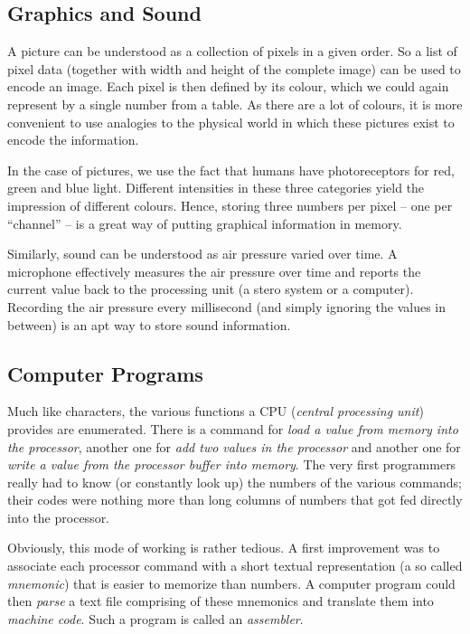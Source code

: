 \subsection{Graphics and Sound}
A picture can be understood as a collection of pixels in a given order. So a list of pixel data (together with width and height of the complete image) can be used to encode an image. Each pixel is then defined by its colour, which we could again represent by a single number from a table. As there are a lot of colours\citationneeded, it is more convenient to use analogies to the physical world in which these pictures exist to encode the information.

In the case of pictures, we use the fact that humans have photoreceptors for red, green and blue light. Different intensities in these three categories yield the impression of different colours. Hence, storing three numbers per pixel -- one per \enquote{channel} -- is a great way of putting graphical information in memory.

Similarly, sound can be understood as air pressure varied over time. A microphone effectively measures the air pressure over time and reports the current value back to the processing unit (\eg a stero system or a computer). Recording the air pressure every millisecond (and simply ignoring the values in between) is an apt way to store sound information.

\subsection{Computer Programs} \label{sec:assembly}
Much like characters, the various functions a CPU (\emph{central processing unit}) provides are enumerated. There is a command for \emph{load a value from memory into the processor}, another one for \emph{add two values in the processor} and another one for \emph{write a value from the processor buffer into memory}. The very first programmers really had to know (or constantly look up) the numbers of the various commands; their codes were nothing more than long columns of numbers that got fed directly into the processor.

Obviously, this mode of working is rather tedious. A first improvement was to associate each processor command with a short textual representation (a so called \emph{mnemonic}) that is easier to memorize than numbers. A computer program could then \emph{parse} a text file comprising of these mnemonics and translate them into \emph{machine code}. Such a program is called an \emph{assembler}.

